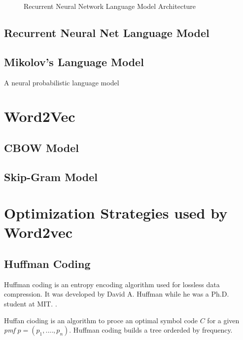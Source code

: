 \begin{figure}[h]
    \centering
    \caption{Recurrent Neural Network Language Model Architecture}
    \label{fig:RNNLM_architecture}
\end{figure}

\subsection{Recurrent Neural Net Language Model}



\subsection{Mikolov's Language Model}

A neural probabilistic language model



\section{Word2Vec}





\subsection{\ac{CBOW} Model}
\subsection{Skip-Gram Model}


\section{Optimization Strategies used by Word2vec}
\label{sec:strategies_improve_time}

\subsection{Huffman Coding}
\label{sec:huffman_coding}

Huffman coding is an entropy  encoding algorithm used for lossless data
compression.  It was developed by David A. Huffman while he was a Ph.D.
student at MIT. \cite{huf52}.

Huffan cioding is an algorithm to proce an  optimal symbol code $C$ for a given 
\emph{pmf} $ p = (p_1,....,p_n) $.  Huffman coding builds a tree orderded by frequency.



